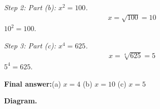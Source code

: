 \documentclass[11pt]{article}
\begin{document}
\textit{Step 2: Part (b): \( x^2 = 100 \).}
\[\begin{gathered}
x = \sqrt{100} = 10
\end{gathered}\]
\( 10^2 = 100 \).

\textit{Step 3: Part (c): \( x^4 = 625 \).}
\[\begin{gathered}
x = \sqrt[4]{625} = 5
\end{gathered}\]
\( 5^4 = 625 \).

\begin{answerbox}
\textbf{Final answer:}\quad (a) \(\displaystyle  x = 4 \) \quad  (b) \(\displaystyle  x = 10 \) \quad  (c) \(\displaystyle  x = 5 \)
\end{answerbox}
\textbf{Diagram.}

\begin{center}
\end{center}
\end{document}

